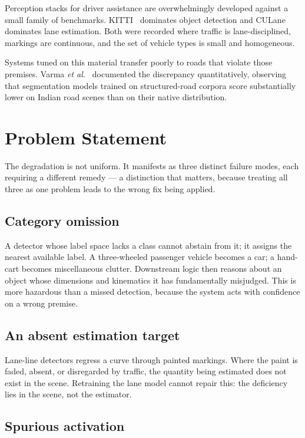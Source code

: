 \documentclass[11pt,a4paper]{report}
\begin{document}
Perception stacks for driver assistance are overwhelmingly developed against a
small family of benchmarks. KITTI~\cite{geiger2012kitti} dominates object
detection and CULane~\cite{pan2018scnn} dominates lane estimation. Both were
recorded where traffic is lane-disciplined, markings are continuous, and the set
of vehicle types is small and homogeneous.

Systems tuned on this material transfer poorly to roads that violate those
premises. Varma \textit{et al.}~\cite{varma2019idd} documented the discrepancy
quantitatively, observing that segmentation models trained on structured-road
corpora score substantially lower on Indian road scenes than on their native
distribution.

\section{Problem Statement}

The degradation is not uniform. It manifests as three distinct failure modes,
each requiring a different remedy — a distinction that matters, because
treating all three as one problem leads to the wrong fix being applied.

\subsection{Category omission}

A detector whose label space lacks a class cannot abstain from it; it assigns
the nearest available label. A three-wheeled passenger vehicle becomes a car; a
hand-cart becomes miscellaneous clutter. Downstream logic then reasons about an
object whose dimensions and kinematics it has fundamentally misjudged. This is
more hazardous than a missed detection, because the system acts with confidence
on a wrong premise.

\subsection{An absent estimation target}

Lane-line detectors regress a curve through painted markings. Where the paint is
faded, absent, or disregarded by traffic, the quantity being estimated does not
exist in the scene. Retraining the lane model cannot repair this: the deficiency
lies in the scene, not the estimator.

\subsection{Spurious activation}
\end{document}
